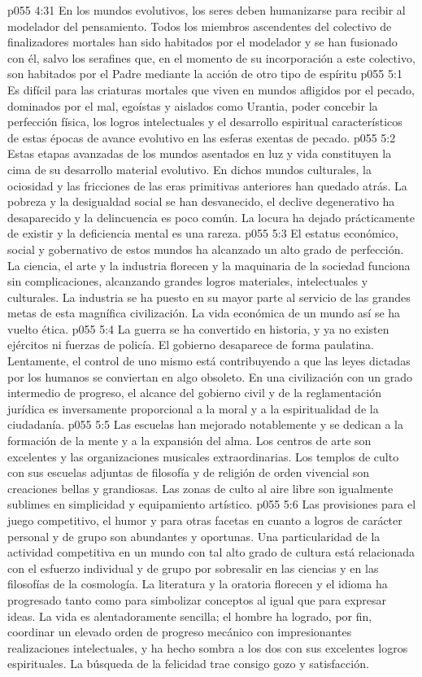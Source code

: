 \vs p055 4:31 En los mundos evolutivos, los seres deben humanizarse para recibir al modelador del pensamiento. Todos los miembros ascendentes del colectivo de finalizadores mortales han sido habitados por el modelador y se han fusionado con él, salvo los serafines que, en el momento de su incorporación a este colectivo, son habitados por el Padre mediante la acción de otro tipo de espíritu
\vs p055 5:1 Es difícil para las criaturas mortales que viven en mundos afligidos por el pecado, dominados por el mal, egoístas y aislados como Urantia, poder concebir la perfección física, los logros intelectuales y el desarrollo espiritual característicos de estas épocas de avance evolutivo en las esferas exentas de pecado.
\vs p055 5:2 Estas etapas avanzadas de los mundos asentados en luz y vida constituyen la cima de su desarrollo material evolutivo. En dichos mundos culturales, la ociosidad y las fricciones de las eras primitivas anteriores han quedado atrás. La pobreza y la desigualdad social se han desvanecido, el declive degenerativo ha desaparecido y la delincuencia es poco común. La locura ha dejado prácticamente de existir y la deficiencia mental es una rareza.
\vs p055 5:3 El estatus económico, social y gobernativo de estos mundos ha alcanzado un alto grado de perfección. La ciencia, el arte y la industria florecen y la maquinaria de la sociedad funciona sin complicaciones, alcanzando grandes logros materiales, intelectuales y culturales. La industria se ha puesto en su mayor parte al servicio de las grandes metas de esta magnífica civilización. La vida económica de un mundo así se ha vuelto ética.
\vs p055 5:4 La guerra se ha convertido en historia, y ya no existen ejércitos ni fuerzas de policía. El gobierno desaparece de forma paulatina. Lentamente, el control de uno mismo está contribuyendo a que las leyes dictadas por los humanos se conviertan en algo obsoleto. En una civilización con un grado intermedio de progreso, el alcance del gobierno civil y de la reglamentación jurídica es inversamente proporcional a la moral y a la espiritualidad de la ciudadanía.
\vs p055 5:5 Las escuelas han mejorado notablemente y se dedican a la formación de la mente y a la expansión del alma. Los centros de arte son excelentes y las organizaciones musicales extraordinarias. Los templos de culto con sus escuelas adjuntas de filosofía y de religión de orden vivencial son creaciones bellas y grandiosas. Las zonas de culto al aire libre son igualmente sublimes en simplicidad y equipamiento artístico.
\vs p055 5:6 Las provisiones para el juego competitivo, el humor y para otras facetas en cuanto a logros de carácter personal y de grupo son abundantes y oportunas. Una particularidad de la actividad competitiva en un mundo con tal alto grado de cultura está relacionada con el esfuerzo individual y de grupo por sobresalir en las ciencias y en las filosofías de la cosmología. La literatura y la oratoria florecen y el idioma ha progresado tanto como para simbolizar conceptos al igual que para expresar ideas. La vida es alentadoramente sencilla; el hombre ha logrado, por fin, coordinar un elevado orden de progreso mecánico con impresionantes realizaciones intelectuales, y ha hecho sombra a los dos con sus excelentes logros espirituales. La búsqueda de la felicidad trae consigo gozo y satisfacción.
